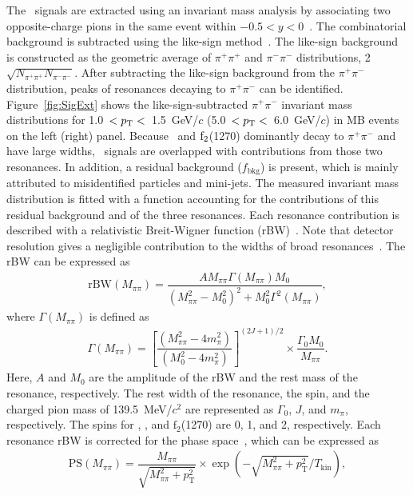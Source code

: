 The \fzero~signals are extracted using an invariant mass analysis by associating two opposite-charge pions in the same event within $-0.5<y<0$~\cite{ALICE:2013wgn}. The combinatorial background is subtracted using the like-sign method~\cite{LIKESIGN}. The like-sign background is constructed as the geometric average of $\pi^{+}\pi^{+}$ and $\pi^{-}\pi^{-}$ distributions, 2$\sqrt{N_{\pi^{+}\pi^{+}}N_{\pi^{-}\pi^{-}}}$. After subtracting the like-sign background from the $\pi^{+}\pi^{-}$ distribution, peaks of resonances decaying to $\pi^{+}\pi^{-}$ can be identified. Figure~\ref{fig:SigExt} shows the like-sign-subtracted $\pi^{+}\pi^{-}$ invariant mass distributions for 1.0~$<p_{\rm{T}}<$~1.5~GeV/$c$ (5.0~$<p_{\rm{T}}<$~6.0~GeV/$c$) in MB events on the left (right) panel. Because \rhoz~and $\rm{f}_{2}$(1270) dominantly decay to $\pi^{+}\pi^{-}$ and have large widths, \fzero~signals are overlapped with contributions from those two resonances. In addition, a residual background ($f_{\mathrm{bkg}}$) is present, which is mainly attributed to misidentified particles and mini-jets. The measured invariant mass distribution is fitted with a function accounting for the contributions of this residual background and of the three resonances. Each resonance contribution is described with a relativistic Breit-Wigner function (rBW)~\cite{ALICE:2018qdv, ALICE:2022qnb}. Note that detector resolution gives a negligible contribution to the widths of broad resonances~\cite{ALICE:2016sak}. The rBW can be expressed as
\begin{eqnarray}
\mathrm{rBW}(M_{\pi\pi}) = \dfrac{AM_{\pi\pi}\Gamma(M_{\pi\pi})M_{0}}{(M_{\pi\pi}^{2}-M_{0}^{2})^{2} + M_{0}^{2}\Gamma^{2}(M_{\pi\pi})},
\label{eq:rBW}
\end{eqnarray}
where $\Gamma(M_{\pi\pi})$ is defined as
\begin{eqnarray}
\Gamma(M_{\pi\pi}) = \left[ \dfrac{ (M_{\pi\pi}^{2} - 4m_{\pi}^{2}) }{ (M_{0}^{2}-4m_{\pi}^{2}) } \right]^{(2J+1)/2} \times \dfrac{\Gamma_{0}M_{0}}{M_{\pi\pi}} .
\label{eq:rBWW}
\end{eqnarray}
Here, $A$ and $M_{0}$ are the amplitude of the rBW and the rest mass of the resonance, respectively. The rest width of the resonance, the spin, and the charged pion mass of 139.5~MeV/$c^{2}$ are represented as $\Gamma_{0}$, $J$, and $m_{\pi}$, respectively. The spins for \fzero, \rhoz, and $\mathrm{f}_{2}$(1270) are 0, 1, and 2, respectively. Each resonance rBW is corrected for the phase space~\cite{ALICE:2018qdv}, which can be expressed as
\begin{eqnarray}
\mathrm{PS}(M_{\pi\pi}) = \dfrac{M_{\pi\pi}}{\sqrt{M_{\pi\pi}^{2}+p_{\mathrm{T}}^{2}}}\times\exp{(-\sqrt{M_{\pi\pi}^{2}+p_{\mathrm{T}}^{2}}/T_{\mathrm{kin}})},
\label{eq:ps}
\end{eqnarray} 
